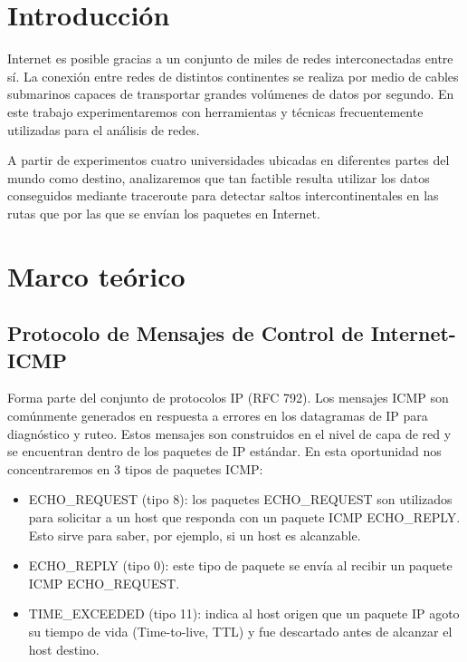 \section{Introducción}

Internet es posible gracias a un conjunto de miles de redes interconectadas entre sí.
La conexión entre redes de distintos continentes se realiza por medio de cables submarinos capaces de transportar grandes volúmenes de datos por segundo.
En este trabajo experimentaremos con herramientas y técnicas frecuentemente utilizadas para el análisis de redes.

A partir de experimentos cuatro universidades ubicadas en diferentes partes del mundo como destino, analizaremos que tan factible resulta utilizar los datos conseguidos mediante traceroute para detectar saltos intercontinentales en las rutas que por las que se envían los paquetes en Internet.  




\section{Marco teórico}

\subsection{Protocolo de Mensajes de Control de Internet- ICMP}

Forma parte del conjunto de protocolos IP (RFC 792). 
Los mensajes ICMP son comúnmente generados en respuesta a errores en los datagramas de IP para diagnóstico y ruteo. Estos mensajes son construidos en el nivel de capa de red y se encuentran dentro de los paquetes de IP estándar.
En esta oportunidad nos concentraremos en 3 tipos de paquetes ICMP:
\begin{itemize}
 \item ECHO\_REQUEST (tipo 8): los paquetes ECHO\_REQUEST son utilizados para solicitar a un host que responda con un paquete ICMP ECHO\_REPLY. Esto sirve para saber, por ejemplo, si un host es alcanzable.
 \item ECHO\_REPLY (tipo 0): este tipo de paquete se envía al recibir un paquete ICMP ECHO\_REQUEST.
 \item TIME\_EXCEEDED (tipo 11): indica al host origen que un paquete IP agoto su tiempo de vida (Time-to-live, TTL) y fue descartado antes de alcanzar el host destino.
\end{itemize}


